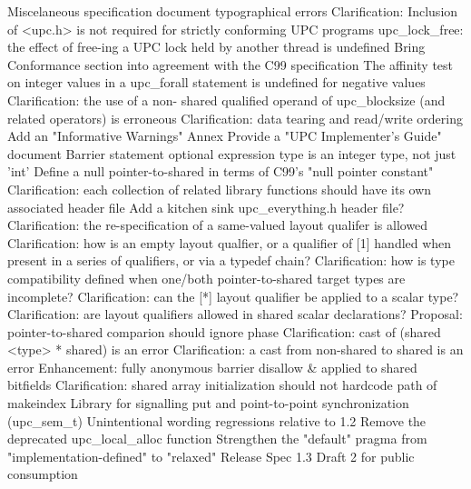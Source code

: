 {      \or %
        Miscelaneous specification document typographical errors
      \or %
        Clarification: Inclusion of <upc.h> is not required for strictly conforming UPC programs
      \or %
        upc\_lock\_free: the effect of free-ing a UPC lock held by another thread is undefined
      \or %
        Bring Conformance section into agreement with the C99 specification
      \or %
        The affinity test on integer values in a upc\_forall statement is undefined for negative values
      \or %
        Clarification: the use of a non- shared qualified operand of upc\_blocksize (and related operators) is erroneous
      \or %
        Clarification: data tearing and read/write ordering
      \or %
        Add an "Informative Warnings" Annex
      \or %
        Provide a "UPC Implementer's Guide" document
      \or %
        Barrier statement optional expression type is an integer type, not just 'int'
      \or %
        Define a null pointer-to-shared in terms of C99's "null pointer constant"
      \or %
        Clarification: each collection of related library functions should have its own associated header file
      \or %
        Add a kitchen sink upc\_everything.h header file?
      \or %
        Clarification: the re-specification of a same-valued layout qualifer is allowed
      \or %
        Clarification: how is an empty layout qualfier, or a qualifier of [1] handled when present in a series of qualifiers, or via a typedef chain?
      \or %
        Clarification: how is type compatibility defined when one/both pointer-to-shared target types are incomplete?
      \or %
        Clarification: can the [*] layout qualifier be applied to a scalar type?
      \or %
        Clarification: are layout qualifiers allowed in shared scalar declarations?
      \or %
        Proposal: pointer-to-shared comparion should ignore phase
      \or %
        Clarification: cast of (shared <type> * shared) is an error
      \or %
        Clarification: a cast from non-shared to shared is an error
      \or %
        Enhancement: fully anonymous barrier
      \or %
        disallow & applied to shared bitfields
      \or %
        Clarification: shared array initialization
      \or %
        should not hardcode path of makeindex
      \or %
        Library for signalling put and point-to-point synchronization (upc\_sem\_t)
      \or %
        Unintentional wording regressions relative to 1.2
      \or %
        Remove the deprecated upc\_local\_alloc function
      \or %
        Strengthen the "default" pragma from "implementation-defined" to "relaxed"
      \or %
        Release Spec 1.3 Draft 2 for public consumption
    \else
        \empty
    \fi
}
